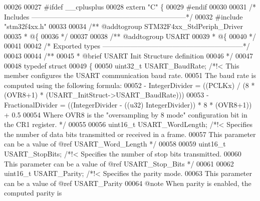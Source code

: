 \begin{DoxyCode}
00026 
00027 \textcolor{preprocessor}{#}\textcolor{preprocessor}{ifdef} \_\_cplusplus
00028  \textcolor{keyword}{extern} \textcolor{stringliteral}{"C"} \{
00029 \textcolor{preprocessor}{#}\textcolor{preprocessor}{endif}
00030 
00031 \textcolor{comment}{/* Includes ------------------------------------------------------------------*/}
00032 \textcolor{preprocessor}{#}\textcolor{preprocessor}{include} "stm32f4xx.h"
00033 
00034 \textcolor{comment}{/** @addtogroup STM32F4xx\_StdPeriph\_Driver}
00035 \textcolor{comment}{  * @\{}
00036 \textcolor{comment}{  */}
00037 
00038 \textcolor{comment}{/** @addtogroup USART}
00039 \textcolor{comment}{  * @\{}
00040 \textcolor{comment}{  */}
00041 
00042 \textcolor{comment}{/* Exported types ------------------------------------------------------------*/}
00043 
00044 \textcolor{comment}{/** }
00045 \textcolor{comment}{  * @brief  USART Init Structure definition  }
00046 \textcolor{comment}{  */}
00047 
00048 \textcolor{keyword}{typedef} \textcolor{keyword}{struct}
00049 \{
00050   uint32\_t USART_BaudRate;            \textcolor{comment}{/*!< This member configures the USART communication baud rate.}
00051 \textcolor{comment}{                                           The baud rate is computed using the following formula:}
00052 \textcolor{comment}{                                            - IntegerDivider = ((PCLKx) / (8 * (OVR8+1) *
       (USART\_InitStruct->USART\_BaudRate)))}
00053 \textcolor{comment}{                                            - FractionalDivider = ((IntegerDivider - ((u32)
       IntegerDivider)) * 8 * (OVR8+1)) + 0.5 }
00054 \textcolor{comment}{                                           Where OVR8 is the "oversampling by 8 mode" configuration
       bit in the CR1 register. */}
00055 
00056   uint16\_t USART_WordLength;          \textcolor{comment}{/*!< Specifies the number of data bits transmitted or received
       in a frame.}
00057 \textcolor{comment}{                                           This parameter can be a value of @ref USART\_Word\_Length */}
00058 
00059   uint16\_t USART_StopBits;            \textcolor{comment}{/*!< Specifies the number of stop bits transmitted.}
00060 \textcolor{comment}{                                           This parameter can be a value of @ref USART\_Stop\_Bits */}
00061 
00062   uint16\_t USART_Parity;              \textcolor{comment}{/*!< Specifies the parity mode.}
00063 \textcolor{comment}{                                           This parameter can be a value of @ref USART\_Parity}
00064 \textcolor{comment}{                                           @note When parity is enabled, the computed parity is
}
\end{DoxyCode}
